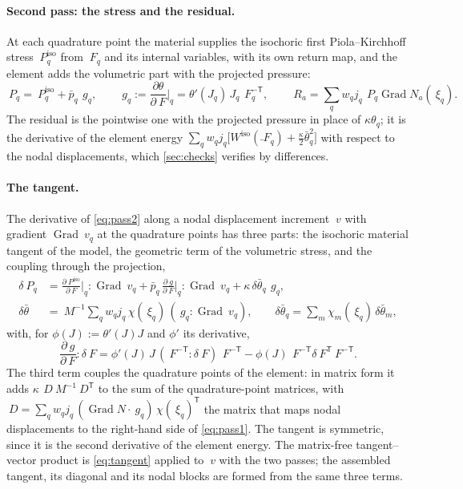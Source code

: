 \documentclass{article}
\newcommand{\F}{~F}
\renewcommand{\P}{~P}
\newcommand{\Grad}{\operatorname{Grad}}
\newcommand{\transpose}[1]{#1^{\mathsf{T}}}
\newcommand{\supiso}{^{\mathrm{iso}}}
\theoremstyle{definition}
\theoremstyle{plain}
\begin{document}
\paragraph{Second pass: the stress and the residual.} At each quadrature
point the material supplies the isochoric first Piola--Kirchhoff stress
$\P\supiso_q$ from $\F_q$ and its internal variables, with its own return
map, and the element adds the volumetric part with the projected pressure:
\begin{equation}
  \label{eq:pass2}
  \P_q = \P\supiso_q + \bar p_q\, ~g_q,
  \qquad
  ~g_q := \frac{\partial\theta}{\partial\F}\Big|_q = \theta'(J_q)\, J_q\, \F_q^{-\mathsf T},
  \qquad
  ~R_a = \sum_q w_q j_q\, \P_q \Grad N_a(~\xi_q) .
\end{equation}
The residual is the pointwise one with the projected pressure in place of
$\kappa\theta_q$; it is the derivative of the element energy
$\sum_q w_q j_q \big[ W\supiso(\bar\F_q) + \tfrac{\kappa}{2} \bar\theta_q^2 \big]$
with respect to the nodal displacements, which \cref{sec:checks} verifies
by differences.

\paragraph{The tangent.} The derivative of \eqref{eq:pass2} along a nodal
displacement increment $~v$ with gradient $\Grad~v_q$ at the quadrature
points has three parts: the isochoric material tangent of the model, the
geometric term of the volumetric stress, and the coupling through the
projection,
\begin{equation}
  \label{eq:tangent}
  \begin{aligned}
  \delta\P_q &= \frac{\partial\P\supiso}{\partial\F}\Big|_q : \Grad~v_q
  + \bar p_q\, \frac{\partial ~g}{\partial\F}\Big|_q : \Grad~v_q
  + \kappa\, \delta\bar\theta_q\, ~g_q, \\
  \delta\bar\theta &= ~M^{-1} \sum_q w_q j_q\, \chi(~\xi_q)\, (~g_q : \Grad~v_q),
  \qquad
  \delta\bar\theta_q = \sum_m \chi_m(~\xi_q)\, \delta\bar\theta_m ,
  \end{aligned}
\end{equation}
with, for $\phi(J) := \theta'(J) J$ and $\phi'$ its derivative,
\begin{equation}
  \label{eq:dg}
  \frac{\partial ~g}{\partial\F} : \delta\F
  = \phi'(J)\, J\, (\F^{-\mathsf T} : \delta\F)\, \F^{-\mathsf T}
  - \phi(J)\, \F^{-\mathsf T} \transpose{\delta\F} \F^{-\mathsf T} .
\end{equation}
The third term couples the quadrature points of the element: in matrix form
it adds $\kappa\, ~D ~M^{-1} \transpose{~D}$ to the sum of the
quadrature-point matrices, with $~D = \sum_q w_q j_q\, (\Grad N \cdot
~g_q)\, \transpose{\chi(~\xi_q)}$ the matrix that maps nodal displacements
to the right-hand side of \eqref{eq:pass1}. The tangent is symmetric, since
it is the second derivative of the element energy. The matrix-free
tangent--vector product is \eqref{eq:tangent} applied to $~v$ with the
two passes; the assembled tangent, its diagonal and its nodal blocks are
formed from the same three terms.
\end{document}

